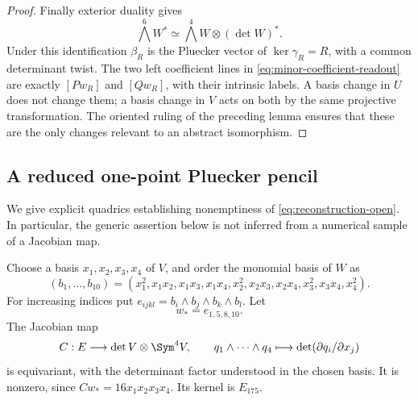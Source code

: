 \begin{proof}
Finally exterior duality gives
\[
 \bigwedge^6W^*\simeq\bigwedge^4W\otimes(\det W)^*.
\]
Under this identification \(\beta_R\) is the Pluecker vector of
\(\ker\gamma_R=R\), with a common determinant twist.  The two
left coefficient lines in \eqref{eq:minor-coefficient-readout}
are exactly \([Pw_R]\) and \([Qw_R]\), with their intrinsic
labels.  A basis change in \(U\) does not change them; a basis
change in \(V\) acts on both by the same projective transformation.
The oriented ruling of the preceding lemma ensures that these are
the only changes relevant to an abstract isomorphism.
\end{proof}

\subsection{A reduced one-point Pluecker pencil}

We give explicit quadrics establishing nonemptiness of
\eqref{eq:reconstruction-open}.  In particular, the generic assertion
below is not inferred from a numerical sample of a Jacobian map.

Choose a basis \(x_1,x_2,x_3,x_4\) of \(V\), and order the
monomial basis of \(W\) as
\[
 (b_1,\ldots,b_{10})=
 (x_1^2,x_1x_2,x_1x_3,x_1x_4,x_2^2,
 x_2x_3,x_2x_4,x_3^2,x_3x_4,x_4^2).
\]
For increasing indices put \(e_{ijkl}=b_i\wedge b_j\wedge
b_k\wedge b_l\).  Let
\[
 w_*=e_{1,5,8,10}.
\]
The Jacobian map
\[
 C:E\longrightarrow\det V\otimes\Sym^4V,\qquad
 q_1\wedge\cdots\wedge q_4\longmapsto
 \det(\partial q_i/\partial x_j)
\]
is equivariant, with the determinant factor understood in the chosen
basis.  It is nonzero, since \(Cw_*=16x_1x_2x_3x_4\).
Its kernel is \(E_{175}\).

